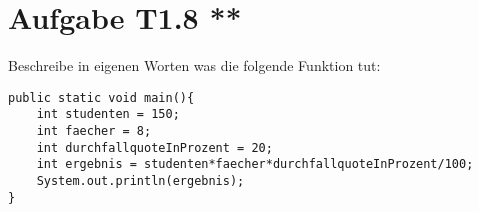 \documentclass[final,a4paper]{article}
\begin{document}
\section*{Aufgabe T1.8 **}
Beschreibe in eigenen Worten was die folgende Funktion tut:
\begin{lstlisting}
public static void main(){
	int studenten = 150;
	int faecher = 8;
	int durchfallquoteInProzent = 20;
	int ergebnis = studenten*faecher*durchfallquoteInProzent/100;
	System.out.println(ergebnis);
}
\end{lstlisting}
\end{document}
